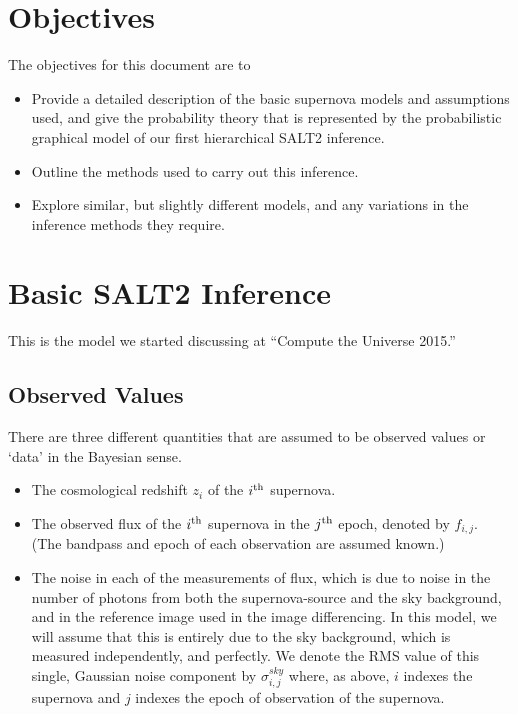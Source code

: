 \documentclass{article}[10pt]
\begin{document}
\section{Objectives}
The objectives for this document are to
\begin{itemize}
\item Provide a detailed description of the basic supernova models and assumptions used, and give the probability theory that is represented by the probabilistic graphical model of our first hierarchical SALT2 inference.
\item Outline the methods used to carry out this inference.
\item Explore similar, but slightly different models, and any variations in the inference methods they require.
\end{itemize}

\section{Basic SALT2 Inference}

This is the model we started discussing at ``Compute the Universe 2015.''

\subsection{Observed Values}

There are three different quantities that are assumed to be observed values or
`data' in the Bayesian sense.
\begin{itemize}
\item The cosmological redshift $z_i$ of the $i^{\rm th}$ supernova.
\item The observed flux of the $i^{\rm th}$ supernova in the $j^{\rm th}$ epoch, denoted by $f_{i,j}$. (The bandpass and epoch of each observation are assumed known.)
\item The noise in each of the measurements of flux, which is due to noise in the number of photons from both the supernova-source and the sky background, and in the reference image used in the image differencing. In this model, we will assume that this is entirely due to the sky background, which is measured independently, and perfectly. We denote the RMS value of this single, Gaussian noise component by
$\sigma^{sky}_{i,j}$ where, as above, $i$ indexes the supernova and $j$ indexes the epoch of observation of the supernova.
\end{itemize}
\end{document}
